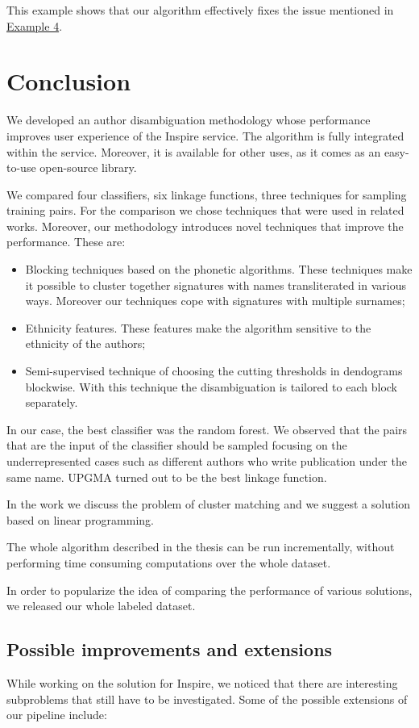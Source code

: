 \documentclass{pracamgr}
\begin{document}
This example shows that our algorithm effectively fixes the issue mentioned in \hyperref[ex4]{Example 4}.


\chapter{Conclusion}

We developed an author disambiguation methodology whose performance improves user experience
of the Inspire service. The algorithm
is fully integrated within the service. Moreover, it is available for other uses,
as it comes as an easy-to-use open-source library.

We compared four classifiers, six linkage functions, three techniques for sampling training pairs.
For the comparison we chose techniques that were used in related works.
Moreover, our methodology introduces novel techniques that improve the performance.
These are:
\begin{itemize}
\item{Blocking techniques based on the phonetic algorithms. These techniques make it possible
to cluster together signatures with names transliterated in various ways. Moreover
our techniques cope with signatures with multiple surnames;}
\item{Ethnicity features. These features make the algorithm sensitive to the ethnicity
of the authors;}
\item{Semi-supervised technique of choosing the cutting thresholds in dendograms blockwise.
With this technique the disambiguation is tailored to each block separately.}
\end{itemize}
In our case, the best classifier was the random forest. We observed that the pairs
that are the input of the classifier should be sampled focusing on the underrepresented
cases such as different authors who write publication under the same name. UPGMA
turned out to be the best linkage function.

In the work we discuss the problem of cluster matching and we suggest a solution based on
linear programming.

The whole algorithm described in the thesis can be run incrementally, without performing
time consuming computations over the whole dataset.

In order to popularize the idea of comparing the performance of various solutions,
we released our whole labeled dataset.

\section{Possible improvements and extensions}
While working on the solution for Inspire, we noticed that there are interesting
subproblems that still have to be investigated. Some of the possible extensions of
our pipeline include:
\end{document}
